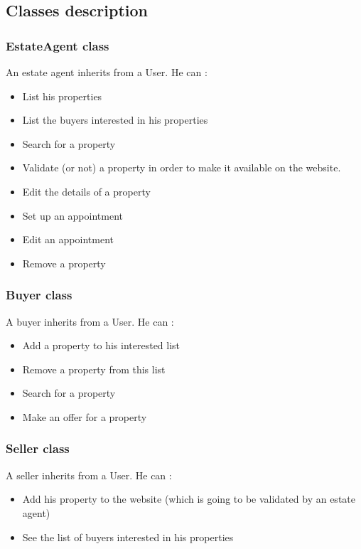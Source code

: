 \documentclass[a4paper,12pt]{article}
\begin{document}
\subsection {Classes description}

\subsubsection{EstateAgent class}
An estate agent inherits from a User.
He can :
\begin{itemize}
\item List his properties
\item List the buyers interested in his properties
\item Search for a property
\item Validate (or not) a property in order to make it available on the website.
\item Edit the details of a property
\item Set up an appointment
\item Edit an appointment
\item Remove a property
\end{itemize}

\subsubsection{Buyer class}
A buyer inherits from a User.
He can :
\begin{itemize}
\item Add a property to his interested list
\item Remove a property from this list
\item Search for a property
\item Make an offer for a property
\end{itemize}

\subsubsection{Seller class}
A seller inherits from a User.
He can :
\begin{itemize}
\item Add his property to the website (which is going to be validated by an estate agent)
\item See the list of buyers interested in his properties
\end{itemize}
\end{document}
